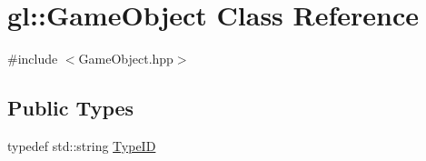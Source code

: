 \hypertarget{classgl_1_1_game_object}{\section{gl\-:\-:Game\-Object Class Reference}
\label{classgl_1_1_game_object}
}


{\ttfamily \#include $<$Game\-Object.\-hpp$>$}

\subsection*{Public Types}
\begin{DoxyCompactItemize}
\item 
typedef std\-::string \hyperlink{classgl_1_1_game_object_af0b06465180bf63b80fe2b6d1288e4a8}{Type\-I\-D}
\end{DoxyCompactItemize}
